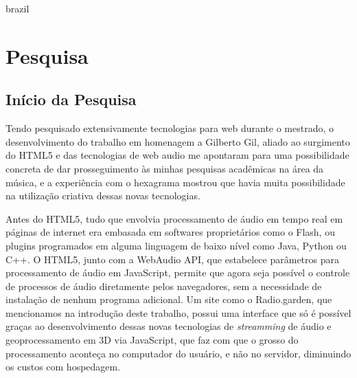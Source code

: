 %


\begin{otherlanguage*}{brazil}

    \chapter{Pesquisa}

    \begin{flushright}
         
    \end{flushright}



    \section{Início da Pesquisa}

    Tendo pesquisado extensivamente tecnologias para web durante o mestrado, o desenvolvimento do trabalho em homenagem a Gilberto Gil, aliado ao surgimento do HTML5 e das tecnologias de web audio me apontaram para uma possibilidade concreta de dar prosseguimento às minhas pesquisas acadêmicas na área da música, e a experiência com o hexagrama mostrou que havia muita possibilidade na utilização criativa dessas novas tecnologias. 

Antes do HTML5, tudo que envolvia processamento de áudio em tempo real em páginas de internet era embasada em softwares proprietários como o Flash, ou plugins programados em alguma linguagem de baixo nível como Java, Python ou C++. O HTML5, junto com a WebAudio API, que estabelece parâmetros para processamento de áudio em JavaScript, permite que agora seja possível o controle de processos de áudio diretamente pelos navegadores, sem a necessidade de instalação de nenhum programa adicional. Um site como o Radio.garden, que mencionamos na introdução deste trabalho, possui uma interface que só é possível graças ao desenvolvimento dessas novas tecnologias de \emph{streamming} de áudio e geoprocessamento em 3D via JavaScript, que faz com que o grosso do processamento aconteça no computador do usuário, e não no servidor, diminuindo os custos com hospedagem.


\end{otherlanguage*}
